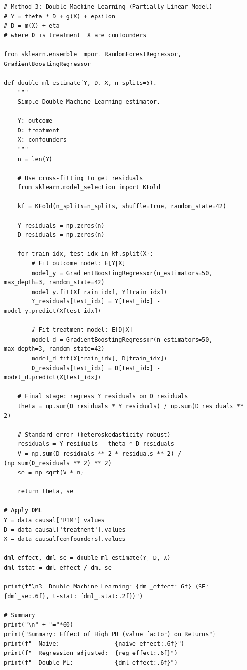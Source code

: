 \begin{verbatim}
# Method 3: Double Machine Learning (Partially Linear Model)
# Y = theta * D + g(X) + epsilon
# D = m(X) + eta
# where D is treatment, X are confounders

from sklearn.ensemble import RandomForestRegressor, GradientBoostingRegressor

def double_ml_estimate(Y, D, X, n_splits=5):
    """
    Simple Double Machine Learning estimator.
    
    Y: outcome
    D: treatment
    X: confounders
    """
    n = len(Y)
    
    # Use cross-fitting to get residuals
    from sklearn.model_selection import KFold
    
    kf = KFold(n_splits=n_splits, shuffle=True, random_state=42)
    
    Y_residuals = np.zeros(n)
    D_residuals = np.zeros(n)
    
    for train_idx, test_idx in kf.split(X):
        # Fit outcome model: E[Y|X]
        model_y = GradientBoostingRegressor(n_estimators=50, max_depth=3, random_state=42)
        model_y.fit(X[train_idx], Y[train_idx])
        Y_residuals[test_idx] = Y[test_idx] - model_y.predict(X[test_idx])
        
        # Fit treatment model: E[D|X]
        model_d = GradientBoostingRegressor(n_estimators=50, max_depth=3, random_state=42)
        model_d.fit(X[train_idx], D[train_idx])
        D_residuals[test_idx] = D[test_idx] - model_d.predict(X[test_idx])
    
    # Final stage: regress Y residuals on D residuals
    theta = np.sum(D_residuals * Y_residuals) / np.sum(D_residuals ** 2)
    
    # Standard error (heteroskedasticity-robust)
    residuals = Y_residuals - theta * D_residuals
    V = np.sum(D_residuals ** 2 * residuals ** 2) / (np.sum(D_residuals ** 2) ** 2)
    se = np.sqrt(V * n)
    
    return theta, se

# Apply DML
Y = data_causal['R1M'].values
D = data_causal['treatment'].values
X = data_causal[confounders].values

dml_effect, dml_se = double_ml_estimate(Y, D, X)
dml_tstat = dml_effect / dml_se

print(f"\n3. Double Machine Learning: {dml_effect:.6f} (SE: {dml_se:.6f}, t-stat: {dml_tstat:.2f})")

# Summary
print("\n" + "="*60)
print("Summary: Effect of High PB (value factor) on Returns")
print(f"  Naive:                {naive_effect:.6f}")
print(f"  Regression adjusted:  {reg_effect:.6f}")
print(f"  Double ML:            {dml_effect:.6f}")
\end{verbatim}

